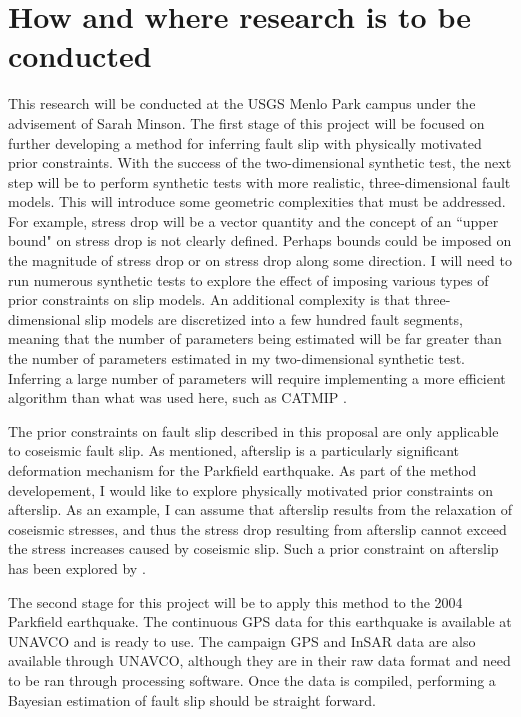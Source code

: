 \documentclass[12pt]{article}
\begin{document}
\section*{How and where research is to be conducted}
This research will be conducted at the USGS Menlo Park campus under the advisement of Sarah Minson.  The first stage of this project will be focused on further developing a method for inferring fault slip with physically motivated prior constraints.  With the success of the two-dimensional synthetic test, the next step will be to perform synthetic tests with more realistic, three-dimensional fault models.  This will introduce some geometric complexities that must be addressed.  For example, stress drop will be a vector quantity and the concept of an ``upper bound" on stress drop is not clearly defined.  Perhaps bounds could be imposed on the magnitude of stress drop or on stress drop along some direction.  I will need to run numerous synthetic tests to explore the effect of imposing various types of prior constraints on slip models.  An additional complexity is that three-dimensional slip models are discretized into a few hundred fault segments, meaning that the number of parameters being estimated will be far greater than the number of parameters estimated in my two-dimensional synthetic test. Inferring a large number of parameters will require implementing a more efficient algorithm than what was used here, such as CATMIP \citep{Minson2013}. 

The prior constraints on fault slip described in this proposal are only applicable to coseismic fault slip.  As mentioned, afterslip is a particularly significant deformation mechanism for the Parkfield earthquake. As part of the method developement, I would like to explore physically motivated prior constraints on afterslip.  As an example, I can assume that afterslip results from the relaxation of coseismic stresses, and thus the stress drop resulting from afterslip cannot exceed the stress increases caused by coseismic slip.  Such a prior constraint on afterslip has been explored by \citet{Johnson2012}.  

The second stage for this project will be to apply this method to the 2004 Parkfield earthquake.  The continuous GPS data for this earthquake is available at UNAVCO and is ready to use.  The campaign GPS and InSAR data are also available through UNAVCO, although they are in their raw data format and need to be ran through processing software.  Once the data is compiled, performing a Bayesian estimation of fault slip should be straight forward.        
\end{document}
